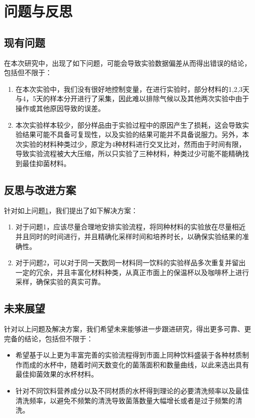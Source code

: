 \documentclass[12pt,a4paper]{ctexart}
\begin{document}
\section{问题与反思}\label{sec:problem}
\subsection{现有问题}
在本次研究中，出现了如下问题，可能会导致实验数据偏差从而得出错误的结论，包括但不限于：
\begin{enumerate}
    \item 在本次实验中，我们没有很好地控制变量，在进行实验时，部分材料的1,2,3天与4，5天的样本分开进行了采集，因此难以排除气候以及其他两次实验中由于操作或其他原因导致的误差。
    \item 本次实验样本较少，部分样品由于实验过程中的原因产生了损耗，这会导致实验结果可能不具备可复现性，以及实验的结果可能并不具备说服力。另外，本次实验的材料种类过少，原定为4种材料进行交叉比对，然而由于时间有限，导致实验流程被大大压缩，所以只实验了三种材料，种类过少可能不能精确找到最佳抑菌材料。
\end{enumerate}

\subsection{反思与改进方案}
针对如上问题\ref{sec:problem}，我们提出了如下解决方案：
\begin{enumerate}
    \item 对于问题1，应该尽量合理地安排实验流程，将同种材料的实验放在尽量相近并且同时的时间进行，并且精确化采样时间和培养时长，以确保实验结果的准确性。
    \item 对于问题2，可以对于同一天数同一材料同一饮料的实验样品多次重复并留出一定的冗余，并且丰富化材料种类，从真正市面上的保温杯以及咖啡杯上进行采样，确保实验的真实可靠。
\end{enumerate}

\subsection{未来展望}
针对以上问题及解决方案，我们希望未来能够进一步跟进研究，得出更多可靠、更完备的结论，包括但不限于：
\begin{itemize}
    \item 希望基于以上更为丰富完善的实验流程得到市面上同种饮料盛装于各种材质制作而成的水杯中，随着时间天数变化的菌落面积和数量曲线，以此来选出具有最佳抑菌效果的水杯材料。
    \item 针对不同饮料营养成分以及不同材质的水杯得到理论的必要清洗频率以及最佳清洗频率，以避免不频繁的清洗导致菌落数量大幅增长或者是过于频繁的清洗。
\end{itemize}
\end{document}
